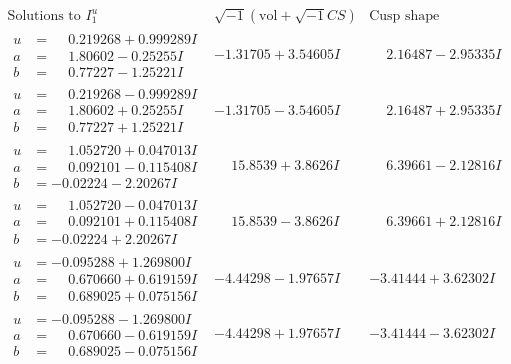\documentclass[1p]{elsarticle_modified}
\theoremstyle{definition}
\newcommand{\I}{\sqrt{-1}}
\begin{document}
$$\begin{array}{c|c|c}  
\text{Solutions to }I^u_{1}& \I (\text{vol} + \sqrt{-1}CS) & \text{Cusp shape}\\
 \hline 
\begin{aligned}
u &= \phantom{-}0.219268 + 0.999289 I \\
a &= \phantom{-}1.80602 - 0.25255 I \\
b &= \phantom{-}0.77227 - 1.25221 I\end{aligned}
 & -1.31705 + 3.54605 I & \phantom{-}2.16487 - 2.95335 I \\ \hline\begin{aligned}
u &= \phantom{-}0.219268 - 0.999289 I \\
a &= \phantom{-}1.80602 + 0.25255 I \\
b &= \phantom{-}0.77227 + 1.25221 I\end{aligned}
 & -1.31705 - 3.54605 I & \phantom{-}2.16487 + 2.95335 I \\ \hline\begin{aligned}
u &= \phantom{-}1.052720 + 0.047013 I \\
a &= \phantom{-}0.092101 - 0.115408 I \\
b &= -0.02224 - 2.20267 I\end{aligned}
 & \phantom{-}15.8539 + 3.8626 I & \phantom{-}6.39661 - 2.12816 I \\ \hline\begin{aligned}
u &= \phantom{-}1.052720 - 0.047013 I \\
a &= \phantom{-}0.092101 + 0.115408 I \\
b &= -0.02224 + 2.20267 I\end{aligned}
 & \phantom{-}15.8539 - 3.8626 I & \phantom{-}6.39661 + 2.12816 I \\ \hline\begin{aligned}
u &= -0.095288 + 1.269800 I \\
a &= \phantom{-}0.670660 + 0.619159 I \\
b &= \phantom{-}0.689025 + 0.075156 I\end{aligned}
 & -4.44298 - 1.97657 I & -3.41444 + 3.62302 I \\ \hline\begin{aligned}
u &= -0.095288 - 1.269800 I \\
a &= \phantom{-}0.670660 - 0.619159 I \\
b &= \phantom{-}0.689025 - 0.075156 I\end{aligned}
 & -4.44298 + 1.97657 I & -3.41444 - 3.62302 I \\ \hline\begin{aligned}

\end{aligned}
\end{array}$$
\end{document}
